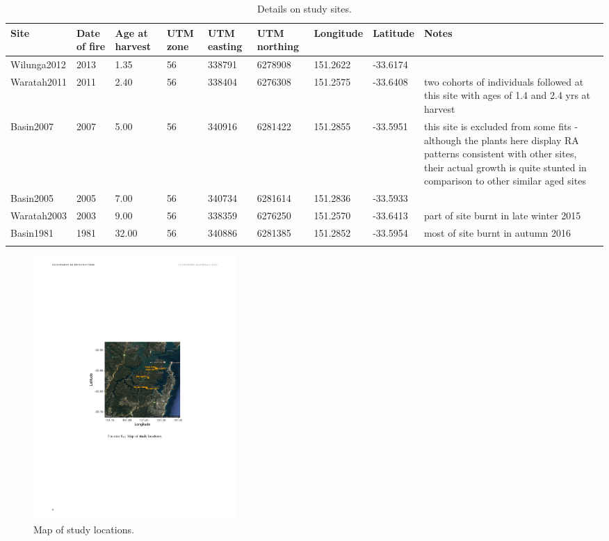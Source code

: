 \documentclass[10pt,twoside]{article}\usepackage[]{graphicx}\usepackage[]{color}
\begin{document}
\endgroup
\begingroup\small
\begin{longtable}{p{2cm}p{1cm}p{1cm}p{1cm}p{1.2cm}p{1.2cm}p{1.2cm}p{1.2cm}p{5cm}}
\caption{Details on study sites.} \\ 
  \hline
Site & Date of fire & Age at harvest & UTM zone & UTM easting & UTM northing & Longitude & Latitude & Notes \\ 
  \hline
Wilunga2012 & 2013 & 1.35 & 56 & 338791 & 6278908 & 151.2622 & -33.6174 &  \\ 
  Waratah2011 & 2011 & 2.40 & 56 & 338404 & 6276308 & 151.2575 & -33.6408 & two cohorts of individuals followed at this site with ages of 1.4 and 2.4 yrs at harvest \\ 
  Basin2007 & 2007 & 5.00 & 56 & 340916 & 6281422 & 151.2855 & -33.5951 & this site is excluded from some fits - although the plants here display RA patterns consistent with other sites, their actual growth is quite stunted in comparison to other similar aged sites \\ 
  Basin2005 & 2005 & 7.00 & 56 & 340734 & 6281614 & 151.2836 & -33.5933 &  \\ 
  Waratah2003 & 2003 & 9.00 & 56 & 338359 & 6276250 & 151.2570 & -33.6413 & part of site burnt in late winter 2015 \\ 
  Basin1981 & 1981 & 32.00 & 56 & 340886 & 6281385 & 151.2852 & -33.5954 & most of site burnt in autumn 2016 \\ 
   \hline
\hline
\label{tab:sites}
\end{longtable}
\endgroup


\begin{figure}[h]
\centering
\includegraphics[height=10cm]{../map.pdf}
\caption{Map of study locations.}
\label{fig:map}
\end{figure}
\end{document}
